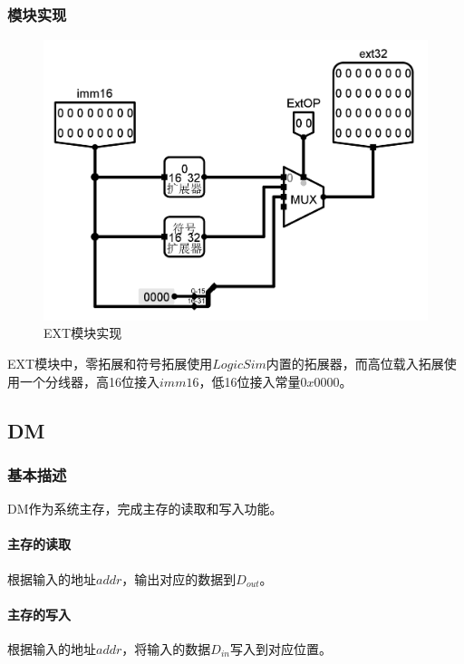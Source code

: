 \documentclass[main.tex]{subfiles}
\begin{document}
\subsubsection{模块实现}
\begin{figure}[h]
\centering
\includegraphics[width=\textwidth]{images/EXT-circuit.png}
\caption{EXT模块实现}
\end{figure}
EXT模块中，零拓展和符号拓展使用$LogicSim$内置的拓展器，而高位载入拓展使用一个分线器，高16位接入$imm16$，低16位接入常量$0x0000$。


\clearpage
\subsection{DM}
\subsubsection{基本描述}
DM作为系统主存，完成主存的读取和写入功能。
\paragraph{主存的读取}
根据输入的地址$addr$，输出对应的数据到$D_{out}$。
\paragraph{主存的写入}
根据输入的地址$addr$，将输入的数据$D_{in}$写入到对应位置。
\end{document}
